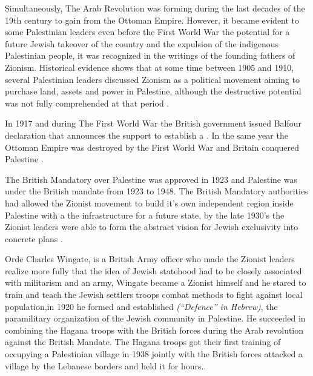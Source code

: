 Simultaneously, The Arab Revolution was forming during the last decades of the 19th century to gain  from the Ottoman Empire. However, it became evident to some Palestinian leaders even before the First World War the potential for a future Jewish takeover of the country and the expulsion of the indigenous Palestinian people, it was recognized in the writings of the founding fathers of Zionism. Historical evidence shows that at some time between 1905 and 1910, 
several Palestinian leaders discussed Zionism as a political movement 
aiming to purchase land, assets and power in Palestine, although the 
destructive potential was not fully comprehended at that period \citep{Pappe2006}.



 In 1917 and during The First World War the British government issued Balfour declaration that  announces the support to establish a . In the same year the Ottoman Empire was destroyed by the First World War and Britain conquered Palestine \citep{Morris2004}.  
 
 
 
 
 
 The British Mandatory over Palestine was approved in 1923 and Palestine was under the British mandate from 1923 to 1948. The British Mandatory authorities had allowed the Zionist movement to build it's own independent region inside Palestine with a the infrastructure for a future state, by the late 1930's the Zionist leaders were able to form the abstract vision for Jewish exclusivity into concrete plans \citep{Pappe2006}.  
 
Orde Charles Wingate, is a British Army officer who made the Zionist leaders realize more fully that the idea of Jewish statehood had to be closely associated with militarism and an army, Wingate became a Zionist himself and he stared to train and teach the Jewish settlers troops combat methods to fight against local population,in 1920 he formed and established  \textit{(“Defence” in Hebrew)}, the paramilitary organization of the Jewish community in Palestine. He succeeded in combining the Hagana troops with the British forces during the Arab revolution against the British Mandate. The Hagana troops got their first training of occupying a Palestinian village in 1938 jointly with the British forces attacked a village by the Lebanese borders and held it for hours\citep{Pappe2006}.\cite [p.112]{Fenby2018}. 

